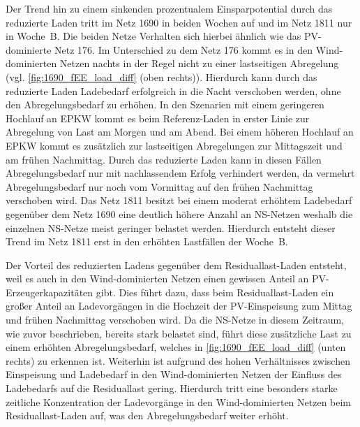 

Der Trend hin zu einem sinkenden prozentualem Einsparpotential durch das reduzierte Laden tritt im Netz \num{1690} in beiden Wochen auf und im Netz \num{1811} nur in Woche~B.
Die beiden Netze Verhalten sich hierbei ähnlich wie das \gls{PV}-dominierte Netz \num{176}.
Im Unterschied zu dem Netz \num{176} kommt es in den Wind-dominierten Netzen nachts in der Regel nicht zu einer lastseitigen Abregelung (vgl. \autoref{fig:1690_fEE_load_diff} (oben rechts)).
Hierdurch kann durch das reduzierte Laden Ladebedarf erfolgreich in die Nacht verschoben werden, ohne den Abregelungsbedarf zu erhöhen.
In den Szenarien mit einem geringeren Hochlauf an \gls{EPKW} kommt es beim Referenz-Laden in erster Linie zur Abregelung von Last am Morgen und am Abend.
Bei einem höheren Hochlauf an \gls{EPKW} kommt es zusätzlich zur lastseitigen Abregelungen zur Mittagszeit und am frühen Nachmittag.
Durch das reduzierte Laden kann in diesen Fällen Abregelungsbedarf nur mit nachlassendem Erfolg verhindert werden, da vermehrt Abregelungsbedarf nur noch vom Vormittag auf den frühen Nachmittag verschoben wird.
Das Netz \num{1811} besitzt bei einem moderat erhöhtem Ladebedarf gegenüber dem Netz \num{1690} eine deutlich höhere Anzahl an \gls{NS}-Netzen weshalb die einzelnen \gls{NS}-Netze meist geringer belastet werden.
Hierdurch entsteht dieser Trend im Netz \num{1811} erst in den erhöhten Lastfällen der Woche~B.



Der Vorteil des reduzierten Ladens gegenüber dem Residuallast-Laden entsteht, weil es auch in den Wind-dominierten Netzen einen gewissen Anteil an \gls{PV}-Erzeugerkapazitäten gibt.
Dies führt dazu, dass beim Residuallast-Laden ein großer Anteil an Ladevorgängen in die Hochzeit der \gls{PV}-Einspeisung zum Mittag und frühen Nachmittag verschoben wird.
Da die \gls{NS}-Netze in diesem Zeitraum, wie zuvor beschrieben, bereits stark belastet sind, führt diese zusätzliche Last zu einem erhöhten Abregelungsbedarf, welches in \autoref{fig:1690_fEE_load_diff} (unten rechts) zu erkennen ist.
Weiterhin ist aufgrund des hohen Verhältnisses zwischen Einspeisung und Ladebedarf in den Wind-dominierten Netzen der Einfluss des Ladebedarfs auf die Residuallast gering.
Hierdurch tritt eine besonders starke zeitliche Konzentration der Ladevorgänge in den Wind-dominierten Netzen beim Residuallast-Laden auf, was den Abregelungsbedarf weiter erhöht.

